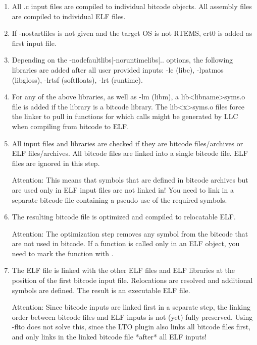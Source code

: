 \begin{enumerate}
\item All .c input files are compiled to individual bitcode objects. All assembly files are compiled to
   individual ELF files.

\item If -nostartfiles is not given and the target OS is not RTEMS, crt0 is added as first input file.

\item Depending on the -nodefaultlibs|-noruntimelibs|.. options, the following libraries are added
   after all user provided inputs: -lc (libc), -lpatmos (libgloss), -lrtsf (softfloats), -lrt (runtime).

\item For any of the above libraries, as well as -lm (libm), a lib<libname>syms.o file is added if the library
   is a bitcode library. The lib<x>syms.o files force the linker to pull in functions for which calls might be
   generated by LLC when compiling from bitcode to ELF.

\item All input files and libraries are checked if they are bitcode files/archives or ELF files/archives. All
   bitcode files are linked into a single bitcode file. ELF files are ignored in this step.

Attention: This means that symbols that are defined in bitcode archives but are used only in ELF input files
   are not linked in! You need to link in a separate bitcode file containing a pseudo use of the required symbols.

\item The resulting bitcode file is optimized and compiled to relocatable ELF.

Attention: The optimization step removes any symbol from the bitcode that are not used in bitcode.
   If a function is called only in an ELF object, you need to mark the function with .

\item The ELF file is linked with the other ELF files and ELF libraries at the position of the first bitcode input file.
   Relocations are resolved and additional symbols are defined. The result is an executable ELF file.

Attention: Since bitcode inputs are linked first in a separate step, the linking order between bitcode files
   and ELF inputs is not (yet) fully preserved. Using -flto does not solve this, since the LTO plugin also
   links all bitcode files first, and only links in the linked bitcode file *after* all ELF inputs!

\end{enumerate}

